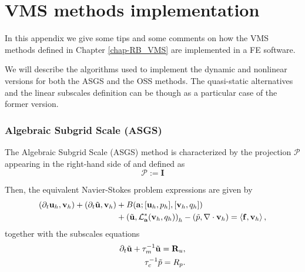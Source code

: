 
\chapter{VMS methods implementation} %
\label{appendix-VMS_implementation}

In this appendix we give some tips and some comments on how the VMS methods defined  in Chapter \ref{chap-RB_VMS} are implemented in a FE software.

We will describe the algorithms used to implement the dynamic and nonlinear versions for both the ASGS and the OSS methods. The quasi-static alternatives and the linear subscales definition can be though as a particular case of the former version.

\subsection*{Algebraic Subgrid Scale (ASGS)}
The Algebraic Subgrid Scale (ASGS) method is characterized by the projection $\mathcal{P}$ appearing in the right-hand side of  and  defined as
\begin{equation}
\label{4}
\mathcal{P}:=\mathbf{I}
\end{equation}

Then, the equivalent Navier-Stokes problem expressions are given by
\begin{align}
\label{5}
(\partial_t{\bf u}_h,{\bf v}_h)+(\partial_t\tilde{{\bf u}},{\bf v}_h)&+B({\bf a};[{\bf u}_h,p_h],[{\bf v}_h,q_h])\\\nonumber
&+\left(\tilde{{\bf u}},\mathcal{L}_{{\bf a}}^*({\bf v}_h,q_h)\right)_h-\left(\tilde{p},\nabla\cdot{\bf v}_h\right)=\left<{\bf f},{\bf v}_h\right>,
\end{align}
together with the subscales equations
\begin{align}
\label{eq-A2_velo_asgs}
\partial_t\tilde{{\bf u}}+\tau_m^{-1}\tilde{{\bf u}}={\bf R}_u,\\
\label{eq-A2_press_asgs}
\tau_c^{-1}\tilde{p}=R_p.
\end{align}

